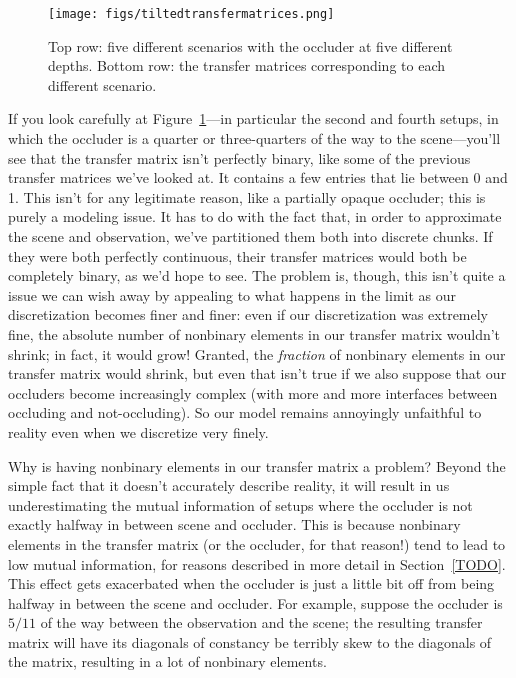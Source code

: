 \begin{figure}
\begin{center}
\texttt{[image: figs/tiltedtransfermatrices.png]}
\caption{Top row: five different scenarios with the occluder at five different depths. Bottom row: the transfer matrices corresponding to each different scenario. \label{fig:tiltedtransfermatrices}}
\end{center}
\end{figure}
    
If you look carefully at Figure~\ref{fig:tiltedtransfermatrices}---in particular the second and fourth setups, in which the occluder is a quarter or three-quarters of the way to the scene---you'll see that the transfer matrix isn't perfectly binary, like some of the previous transfer matrices we've looked at. It contains a few entries that lie between 0 and 1. This isn't for any legitimate reason, like a partially opaque occluder; this is purely a modeling issue. It has to do with the fact that, in order to approximate the scene and observation, we've partitioned them both into discrete chunks. If they were both perfectly continuous, their transfer matrices would both be completely binary, as we'd hope to see. The problem is, though, this isn't quite a issue we can wish away by appealing to what happens in the limit as our discretization becomes finer and finer: even if our discretization was extremely fine, the absolute number of nonbinary elements in our transfer matrix wouldn't shrink; in fact, it would grow! Granted, the \emph{fraction} of nonbinary elements in our transfer matrix would shrink, but even that isn't true if we also suppose that our occluders become increasingly complex (with more and more interfaces between occluding and not-occluding). So our model remains annoyingly unfaithful to reality even when we discretize very finely.

Why is having nonbinary elements in our transfer matrix a problem? Beyond the simple fact that it doesn't accurately describe reality, it will result in us  underestimating the mutual information of setups where the occluder is not exactly halfway in between scene and occluder. This is because nonbinary elements in the transfer matrix (or the occluder, for that reason!) tend to lead to low mutual information, for reasons described in more detail in Section~\ref{TODO}. This effect gets exacerbated when the occluder is just a little bit off from being halfway in between the scene and occluder. For example, suppose the occluder is $5/11$ of the way between the observation and the scene; the resulting transfer matrix will have its diagonals of constancy be terribly skew to the diagonals of the matrix, resulting in a lot of nonbinary elements. 


